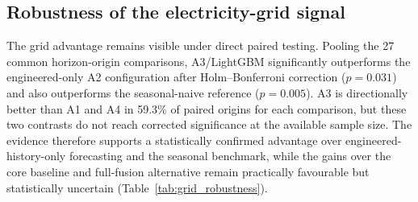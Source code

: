\documentclass[preprint,12pt]{elsarticle}
\begin{document}
\subsection{Robustness of the electricity-grid signal}\label{sec:robustness}

The grid advantage remains visible under direct paired testing. Pooling the 27 common horizon-origin comparisons, A3/LightGBM significantly outperforms the engineered-only A2 configuration after Holm--Bonferroni correction ($p=0.031$) and also outperforms the seasonal-naive reference ($p=0.005$). A3 is directionally better than A1 and A4 in 59.3\% of paired origins for each comparison, but these two contrasts do not reach corrected significance at the available sample size. The evidence therefore supports a statistically confirmed advantage over engineered-history-only forecasting and the seasonal benchmark, while the gains over the core baseline and full-fusion alternative remain practically favourable but statistically uncertain (Table~\ref{tab:grid_robustness}).
\end{document}
